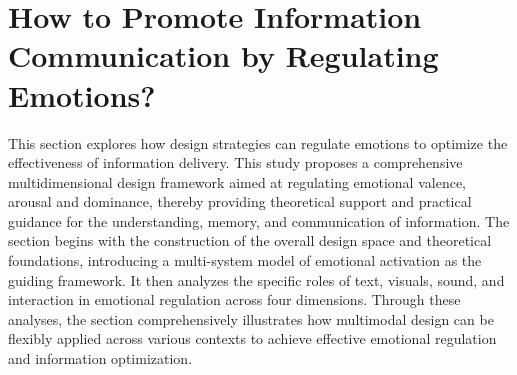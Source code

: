 \section{How to Promote Information Communication by Regulating Emotions?}\label{sec:how} %




This section explores how design strategies can regulate emotions to optimize the effectiveness of information delivery. This study proposes a comprehensive multidimensional design framework aimed at regulating emotional valence, arousal and dominance, thereby providing theoretical support and practical guidance for the understanding, memory, and communication of information. The section begins with the construction of the overall design space and theoretical foundations, introducing a multi-system model of emotional activation as the guiding framework. It then analyzes the specific roles of text, visuals, sound, and interaction in emotional regulation across four dimensions. Through these analyses, the section comprehensively illustrates how multimodal design can be flexibly applied across various contexts to achieve effective emotional regulation and information optimization.



